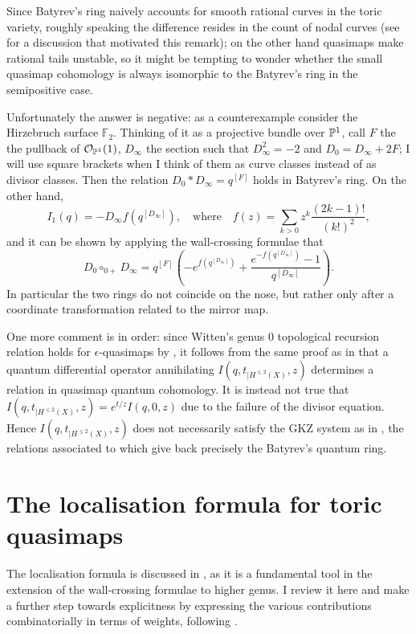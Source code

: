Since Batyrev's ring naively accounts for smooth rational curves in the toric variety, roughly speaking the difference resides in the count of nodal curves (see \cite{HScounting} for a discussion that motivated this remark); on the other hand quasimaps make rational tails unstable, so it might be tempting to wonder whether the small quasimap cohomology is always isomorphic to the Batyrev's ring in the semipositive case.

Unfortunately the answer is negative: as a counterexample consider the Hirzebruch surface $\mathbb F_2$. Thinking of it as a projective bundle over $\mathbb P^1$, call $F$ the the pullback of $\mathcal{O}_{\mathbb P^1}(1)$, $D_\infty$ the section such that $D_\infty^2=-2$ and $D_0=D_\infty+2F$; I will use square brackets when I think of them as curve classes instead of as divisor classes. Then the relation $D_0*D_\infty=q^{[F]}$ holds in Batyrev's ring. On the other hand, \[I_1(q)=-D_\infty f(q^{[D_\infty]}), \quad \text{where}\quad f(z)=\sum_{k>0}z^k \frac{(2k-1)!}{(k!)^2},\] and it can be shown by applying the wall-crossing formulae that
\[ D_0\circ_{0+}D_\infty=q^{[F]}\left(-e^{f(q^{[D_\infty]})}+\frac{e^{-f(q^{[D_\infty]})}-1}{q^{[D_\infty]}}\right).\]
In particular the two rings do not coincide on the nose, but rather only after a coordinate transformation related to the mirror map.

One more comment is in order: since Witten's genus $0$ topological recursion relation holds for $\epsilon$-quasimaps by \cite[Corollary 2.3.4]{CF-K-higher-genus}, it follows from the same proof as in \cite[Theorem 10.3.1]{MS} that a quantum differential operator annihilating $I(q,t_{|H^{\leq 2}(X)},z)$ determines a relation in quasimap quantum cohomology. It is instead not true that $I(q,t_{|H^{\leq 2}(X)},z)=e^{t/z}I(q,0,z)$ due to the failure of the divisor equation. Hence $I(q,t_{|H^{\leq 2}(X)},z)$ does not necessarily satisfy the GKZ system as in \cite[\S 5.5.3]{MS}, the relations associated to which give back precisely the Batyrev's quantum ring.

\section{The localisation formula for toric quasimaps}\label{sec:loc_formula}
The localisation formula is discussed in \cite[\S 5]{CF-K-higher-genus}, as it is a fundamental tool in the extension of the wall-crossing formulae to higher genus. I review it here and make a further step towards explicitness by expressing the various contributions combinatorially in terms of weights, following \cite{HolgerSpielberg}.

